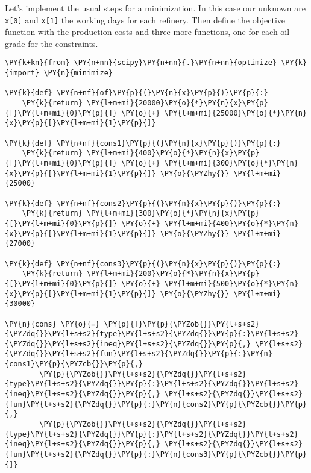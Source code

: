 \begin{Answer}
Let's implement the usual steps for a minimization. In this case our unknown are \texttt{x[0]} and \texttt{x[1]} the working days for each refinery. Then define the objective function with the production costs and three more functions, one for each oil-grade for the constraints.
\begin{tcolorbox}[breakable, size=fbox, boxrule=1pt, pad at break*=1mm,colback=cellbackground, colframe=cellborder]
\begin{Verbatim}[commandchars=\\\{\}]
\PY{k+kn}{from} \PY{n+nn}{scipy}\PY{n+nn}{.}\PY{n+nn}{optimize} \PY{k}{import} \PY{n}{minimize}

\PY{k}{def} \PY{n+nf}{of}\PY{p}{(}\PY{n}{x}\PY{p}{)}\PY{p}{:}
    \PY{k}{return} \PY{l+m+mi}{20000}\PY{o}{*}\PY{n}{x}\PY{p}{[}\PY{l+m+mi}{0}\PY{p}{]} \PY{o}{+} \PY{l+m+mi}{25000}\PY{o}{*}\PY{n}{x}\PY{p}{[}\PY{l+m+mi}{1}\PY{p}{]}

\PY{k}{def} \PY{n+nf}{cons1}\PY{p}{(}\PY{n}{x}\PY{p}{)}\PY{p}{:}
    \PY{k}{return} \PY{l+m+mi}{400}\PY{o}{*}\PY{n}{x}\PY{p}{[}\PY{l+m+mi}{0}\PY{p}{]} \PY{o}{+} \PY{l+m+mi}{300}\PY{o}{*}\PY{n}{x}\PY{p}{[}\PY{l+m+mi}{1}\PY{p}{]} \PY{o}{\PYZhy{}} \PY{l+m+mi}{25000}

\PY{k}{def} \PY{n+nf}{cons2}\PY{p}{(}\PY{n}{x}\PY{p}{)}\PY{p}{:}
    \PY{k}{return} \PY{l+m+mi}{300}\PY{o}{*}\PY{n}{x}\PY{p}{[}\PY{l+m+mi}{0}\PY{p}{]} \PY{o}{+} \PY{l+m+mi}{400}\PY{o}{*}\PY{n}{x}\PY{p}{[}\PY{l+m+mi}{1}\PY{p}{]} \PY{o}{\PYZhy{}} \PY{l+m+mi}{27000}

\PY{k}{def} \PY{n+nf}{cons3}\PY{p}{(}\PY{n}{x}\PY{p}{)}\PY{p}{:}
    \PY{k}{return} \PY{l+m+mi}{200}\PY{o}{*}\PY{n}{x}\PY{p}{[}\PY{l+m+mi}{0}\PY{p}{]} \PY{o}{+} \PY{l+m+mi}{500}\PY{o}{*}\PY{n}{x}\PY{p}{[}\PY{l+m+mi}{1}\PY{p}{]} \PY{o}{\PYZhy{}} \PY{l+m+mi}{30000}

\PY{n}{cons} \PY{o}{=} \PY{p}{[}\PY{p}{\PYZob{}}\PY{l+s+s2}{\PYZdq{}}\PY{l+s+s2}{type}\PY{l+s+s2}{\PYZdq{}}\PY{p}{:}\PY{l+s+s2}{\PYZdq{}}\PY{l+s+s2}{ineq}\PY{l+s+s2}{\PYZdq{}}\PY{p}{,} \PY{l+s+s2}{\PYZdq{}}\PY{l+s+s2}{fun}\PY{l+s+s2}{\PYZdq{}}\PY{p}{:}\PY{n}{cons1}\PY{p}{\PYZcb{}}\PY{p}{,}
        \PY{p}{\PYZob{}}\PY{l+s+s2}{\PYZdq{}}\PY{l+s+s2}{type}\PY{l+s+s2}{\PYZdq{}}\PY{p}{:}\PY{l+s+s2}{\PYZdq{}}\PY{l+s+s2}{ineq}\PY{l+s+s2}{\PYZdq{}}\PY{p}{,} \PY{l+s+s2}{\PYZdq{}}\PY{l+s+s2}{fun}\PY{l+s+s2}{\PYZdq{}}\PY{p}{:}\PY{n}{cons2}\PY{p}{\PYZcb{}}\PY{p}{,}
        \PY{p}{\PYZob{}}\PY{l+s+s2}{\PYZdq{}}\PY{l+s+s2}{type}\PY{l+s+s2}{\PYZdq{}}\PY{p}{:}\PY{l+s+s2}{\PYZdq{}}\PY{l+s+s2}{ineq}\PY{l+s+s2}{\PYZdq{}}\PY{p}{,} \PY{l+s+s2}{\PYZdq{}}\PY{l+s+s2}{fun}\PY{l+s+s2}{\PYZdq{}}\PY{p}{:}\PY{n}{cons3}\PY{p}{\PYZcb{}}\PY{p}{]}
    \end{Verbatim}
\end{tcolorbox}


\end{Answer}
